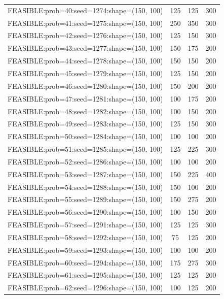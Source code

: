 \begin{longtable}{lccc}
FEASIBLE:prob=40:seed=1274:shape=(150, 100)  &      125 &   125 &    300 \\
FEASIBLE:prob=41:seed=1275:shape=(150, 100)  &      250 &   350 &    300 \\
FEASIBLE:prob=42:seed=1276:shape=(150, 100)  &      125 &   150 &    300 \\
FEASIBLE:prob=43:seed=1277:shape=(150, 100)  &      150 &   175 &    200 \\
FEASIBLE:prob=44:seed=1278:shape=(150, 100)  &      150 &   150 &    200 \\
FEASIBLE:prob=45:seed=1279:shape=(150, 100)  &      125 &   150 &    200 \\
FEASIBLE:prob=46:seed=1280:shape=(150, 100)  &      150 &   200 &    200 \\
FEASIBLE:prob=47:seed=1281:shape=(150, 100)  &      100 &   175 &    200 \\
FEASIBLE:prob=48:seed=1282:shape=(150, 100)  &      100 &   150 &    200 \\
FEASIBLE:prob=49:seed=1283:shape=(150, 100)  &      125 &   150 &    300 \\
FEASIBLE:prob=50:seed=1284:shape=(150, 100)  &      100 &   100 &    200 \\
FEASIBLE:prob=51:seed=1285:shape=(150, 100)  &      125 &   225 &    300 \\
FEASIBLE:prob=52:seed=1286:shape=(150, 100)  &      100 &   100 &    200 \\
FEASIBLE:prob=53:seed=1287:shape=(150, 100)  &      150 &   225 &    400 \\
FEASIBLE:prob=54:seed=1288:shape=(150, 100)  &      150 &   100 &    200 \\
FEASIBLE:prob=55:seed=1289:shape=(150, 100)  &      150 &   275 &    200 \\
FEASIBLE:prob=56:seed=1290:shape=(150, 100)  &      100 &   150 &    200 \\
FEASIBLE:prob=57:seed=1291:shape=(150, 100)  &      125 &   125 &    300 \\
FEASIBLE:prob=58:seed=1292:shape=(150, 100)  &       75 &   125 &    200 \\
FEASIBLE:prob=59:seed=1293:shape=(150, 100)  &      100 &   100 &    200 \\
FEASIBLE:prob=60:seed=1294:shape=(150, 100)  &      175 &   275 &    300 \\
FEASIBLE:prob=61:seed=1295:shape=(150, 100)  &      125 &   125 &    200 \\
FEASIBLE:prob=62:seed=1296:shape=(150, 100)  &      100 &   125 &    200 \\

\end{longtable}

